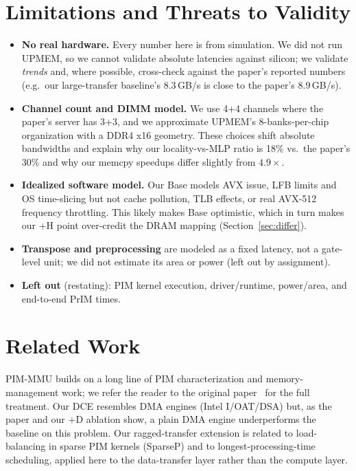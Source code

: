 \documentclass[conference]{IEEEtran}
\begin{document}
\section{Limitations and Threats to Validity}
\label{sec:threats}
\begin{itemize}
\item \textbf{No real hardware.} Every number here is from simulation. We did not
run UPMEM, so we cannot validate absolute latencies against silicon; we validate
\emph{trends} and, where possible, cross-check against the paper's reported
numbers (e.g.\ our large-transfer baseline's $8.3$\,GB/s is close to the paper's $8.9$\,GB/s).
\item \textbf{Channel count and DIMM model.} We use 4+4 channels where the
paper's server has 3+3, and we approximate UPMEM's 8-banks-per-chip organization
with a DDR4 x16 geometry. These choices shift absolute bandwidths and explain
why our locality-vs-MLP ratio is 18\% vs.\ the paper's 30\% and why our memcpy
speedups differ slightly from $4.9\times$.
\item \textbf{Idealized software model.} Our Base models AVX issue, LFB limits
and OS time-slicing but not cache pollution, TLB effects, or real AVX-512
frequency throttling. This likely makes Base optimistic, which in turn makes our
+H point over-credit the DRAM mapping (Section~\ref{sec:differ}).
\item \textbf{Transpose and preprocessing} are modeled as a fixed latency, not a
gate-level unit; we did not estimate its area or power (left out by assignment).
\item \textbf{Left out} (restating): PIM kernel execution, driver/runtime,
power/area, and end-to-end PrIM times.
\end{itemize}

\section{Related Work}
PIM-MMU builds on a long line of PIM characterization and memory-management work;
we refer the reader to the original paper~\cite{pimmmu} for the full
treatment. Our DCE resembles DMA engines (Intel I/OAT/DSA) but, as the paper and
our +D ablation show, a plain DMA engine underperforms the baseline on this
problem. Our ragged-transfer extension is related to load-balancing in sparse
PIM kernels (SparseP) and to longest-processing-time scheduling, applied here to
the data-transfer layer rather than the compute layer.
\end{document}
